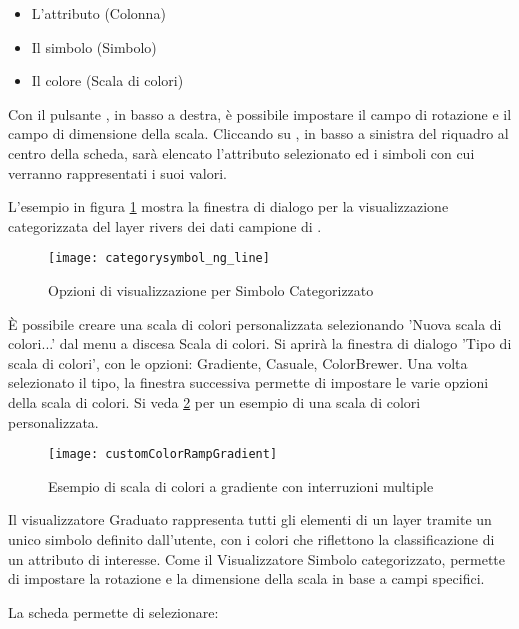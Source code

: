 \begin{itemize}[label=--]
\item L'attributo (Colonna)
\item Il simbolo (Simbolo)
\item Il colore (Scala di colori)
\end{itemize}

Con il pulsante , in basso a destra, è possibile impostare il campo di rotazione 
e il campo di dimensione della scala.
Cliccando su , in basso a sinistra del riquadro al centro della scheda, 
sarà elencato l'attributo selezionato ed i simboli con cui verranno rappresentati i suoi valori.

L'esempio in figura \ref{fig:catsymNG} mostra la finestra di dialogo per la visualizzazione 
categorizzata del layer rivers dei dati campione di \qg.

\begin{figure}[ht]
   \centering
   \caption{Opzioni di visualizzazione per Simbolo Categorizzato \wincaption}\label{fig:catsymNG}
   \texttt{[image: categorysymbol\_ng\_line]}
\end{figure}

È possibile creare una scala di colori personalizzata selezionando 'Nuova scala di colori...' 
dal menu a discesa Scala di colori. Si aprirà la finestra di dialogo 'Tipo di scala di colori', con 
le opzioni: Gradiente, Casuale, ColorBrewer. Una volta selezionato il tipo, la finestra successiva permette 
di impostare le varie opzioni della scala di colori. Si veda \ref{fig:ccrg} per un esempio di una scala 
di colori personalizzata.

\begin{figure}[ht]
   \centering
   \caption{Esempio di scala di colori a gradiente con interruzioni multiple \wincaption}\label{fig:ccrg}
   \texttt{[image: customColorRampGradient]}
\end{figure}


Il visualizzatore Graduato rappresenta tutti gli elementi di un layer 
tramite un unico simbolo definito dall'utente, con i colori che riflettono 
la classificazione di un attributo di interesse. Come il Visualizzatore Simbolo 
categorizzato, permette di impostare la rotazione e la dimensione della scala in 
base a campi specifici.
 
La scheda  permette di selezionare:

